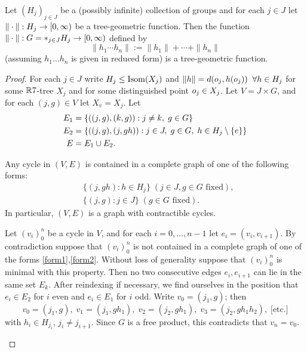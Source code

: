 \begin{theorem}
\label{theoremschottkyproductRtree}
Let $(H_j)_{j\in J}$ be a (possibly infinite) collection of groups and for each $j\in J$ let $\|\cdot\|:H_j\to{[0,\infty)}$ be a tree-geometric function. Then the function $\|\cdot\|:G = \ast_{j\in J} H_j \to{[0,\infty)}$ defined by
\begin{equation}
\label{schottkyproductRtree}
\|h_1 \cdots h_n\| := \|h_1\| + \cdots + \|h_n\|
\end{equation}
(assuming $h_1\ldots h_n$ is given in reduced form) is a tree-geometric function.%
\end{theorem}
\begin{proof}
For each $j\in J$ write $H_j\leq\operatorname{Isom}(X_j)$ and $\|h\| = d(o_j,h(o_j))\;\;\forall h\in H_j$ for some $\R7$-tree $X_j$ and for some distinguished point $o_j\in X_j$. Let $V = J\times G$, and for each $(j,g)\in V$ let $X_v = X_j$. Let
\begin{align*}
E_1 &= \{((j,g),(k,g)) : j\neq k, \; g\in G\}\\
E_2 &= \{((j,g),(j,gh)) : j\in J, \; g\in G,\; h\in H_j\setminus\{e\}\}\\
E &= E_1\cup E_2.
\end{align*}
\begin{claim}
\label{claimcycleE2}
Any cycle in $(V,E)$ is contained in a complete graph of one of the following forms:
\begin{align} \label{form1}
&\{(j,gh): h\in H_j\} \; (j\in J, g\in G \text{ fixed}),\\ \label{form2}
&\{(j,g) : j\in J\} \; (g\in G \text{ fixed}).
\end{align}
In particular, $(V,E)$ is a graph with contractible cycles.
\end{claim}
\begin{subproof}
Let $(v_i)_0^n$ be a cycle in $V$, and for each $i = 0,\ldots,n - 1$ let $e_i = (v_i,v_{i + 1})$. By contradiction suppose that $(v_i)_0^n$ is not contained in a complete graph of one of the forms \eqref{form1},\eqref{form2}. Without loss of generality suppose that $(v_i)_0^n$ is minimal with this property. Then no two consecutive edges $e_i,e_{i + 1}$ can lie in the same set $E_k$. After reindexing if necessary, we find ourselves in the position that $e_i\in E_2$ for $i$ even and $e_i\in E_1$ for $i$ odd. Write $v_0 = (j_1,g)$; then
\[
v_0 = (j_1,g), \; v_1 = (j_1,g h_1), \; v_2 = (j_2,g h_1), \; v_3 = (j_2,g h_1 h_2), \; \text{[etc.]}
\]
with $h_i\in H_{j_i}$, $j_i\neq j_{i + 1}$. Since $G$ is a free product, this contradicts that $v_n = v_0$.
\end{subproof}



\end{proof}
